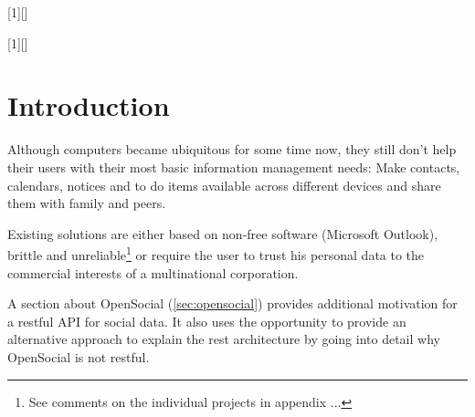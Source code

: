 \documentclass[12pt,a4paper]{scrartcl}		%
\newcommand{\citeurl}[2]{\url{#1} (#2)}
\begin{document}
[1][]
  {\lstset{language=Java,float=tb,#1}}%
  {} %

[1][]
  {\lstset{float=tb,#1}}%
  {} %

\lstset{ %
  language=Java,
  float=tb,
  frame=single,
  captionpos=b
}

\title{}
\subtitle{}
\author{Thomas Koch\\\url{thomas@koch.ro}\\matriculation number 7250371}
\publishers{Fernuniversität Hagen\\Faculty of mathematics and computer science}
\date{\today}
\maketitle{}

\tableofcontents{}
\begin{abstract}

\end{abstract}
\newpage{}

\section{Introduction}

Although computers became ubiquitous for some time now, they still don't help
their users with their most basic information management needs: Make contacts,
calendars, notices and to do items available across different devices and share
them with family and peers.

Existing solutions are either based on non-free software (Microsoft Outlook),
brittle and unreliable\footnote{See comments on the individual projects in
  appendix ...} or require the user to trust his personal data to the commercial
interests of a multinational corporation.


A section about OpenSocial (\autoref{sec:opensocial}) provides additional
motivation for a restful API for social data. It also uses the opportunity to
provide an alternative approach to explain the rest architecture by going into
detail why OpenSocial is not restful.
\end{document}
